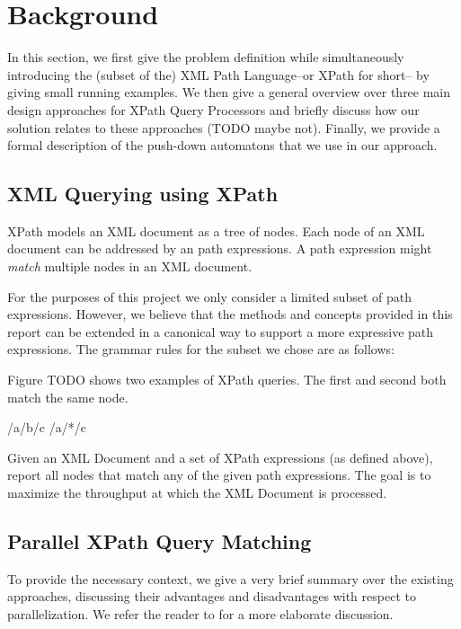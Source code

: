 \section{Background}\label{sec:background}
In this section, we first give the problem definition while simultaneously
introducing the (subset of the) XML Path Language–or XPath for short–
by giving small running examples.
We then give a general overview over three main design approaches for XPath
Query Processors and briefly discuss how our solution relates to these
approaches (TODO maybe not). Finally, we provide a formal description of the
push-down automatons that we use in our approach.

\subsection{XML Querying using XPath}

XPath models an XML document as a tree of nodes. Each node of an XML document
can be addressed by an path expressions. A path expression might \emph{match}
multiple nodes in an XML document.

For the purposes of this project we only consider a limited subset of path
expressions. However, we believe that the methods and concepts provided in this
report can be extended in a canonical way to support a more expressive path
expressions. The grammar rules for the subset we chose are as follows:


Figure TODO shows two examples of XPath queries. The first and second both match
the same node.

/a/b/c
/a/*/c

 Given an XML Document and a set of XPath
expressions (as defined above), report all nodes that match any of the given
path expressions. The goal is to maximize the throughput at which the XML
Document is processed.


\subsection{Parallel XPath Query Matching}

To provide the necessary context, we give a very brief summary over the existing
approaches, discussing their advantages and disadvantages with respect to
parallelization. We refer the reader to  for a more elaborate
discussion.

